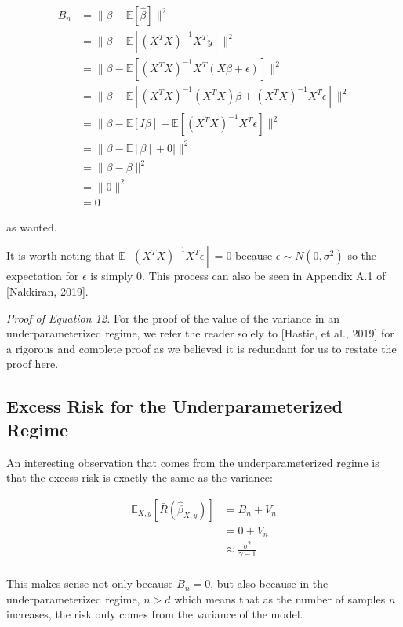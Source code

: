 \documentclass{article}
\begin{document}
\begin{align*}
    B_n &= \|\beta - \mathbb{E}[\hat{\beta}]\|^2\\
    &= \|\beta - \mathbb{E}[(X^{T}X)^{-1}X^{T}y]\|^2\\
    &= \|\beta -  \mathbb{E} [(X^{T}X)^{-1}X^{T} (X\beta + \epsilon)]\|^2\\
    &= \|\beta - \mathbb{E} [(X^{T}X)^{-1}(X^{T}X)\beta + (X^{T}X)^{-1}X^{T}\epsilon]\|^2\\
    &= \|\beta - \mathbb{E}[I\beta] + \mathbb{E} [(X^{T}X)^{-1}X^{T}\epsilon]\|^2\\
    &= \|\beta - \mathbb{E}[\beta] + 0]\|^2\\
    &= \|\beta - \beta\|^2\\
    &= \|0\|^2\\
    &= 0
\end{align*}

as wanted.

It is worth noting that $\mathbb{E} [(X^{T}X)^{-1}X^{T}\epsilon] = 0$ because $\epsilon \sim N(0, \sigma^2)$ so the expectation for $\epsilon$ is simply 0. This process can also be seen in Appendix A.1 of [Nakkiran, 2019].

\emph{Proof of Equation 12.}
For the proof of the value of the variance in an underparameterized regime, we refer the reader solely to [Hastie, et al., 2019] for a rigorous and complete proof as we believed it is redundant for us to restate the proof here.

\subsection{Excess Risk for the Underparameterized Regime}

An interesting observation that comes from the underparameterized regime is that the excess risk is exactly the same as the variance:

\begin{align*}
    \mathbb{E}_{X,y} [\bar{R} (\hat{\beta}_{X,y})] &= B_n + V_n\\
    &= 0 + V_n\\
    &\approx \frac{\sigma^2}{\gamma - 1}\\
\end{align*}

This makes sense not only because $B_n = 0$, but also because in the underparameterized regime, $n>d$ which means that as the number of samples $n$ increases, the risk only comes from the variance of the model. 
\end{document}
